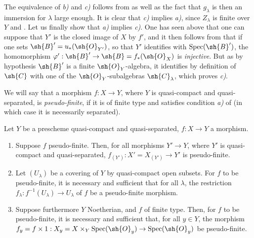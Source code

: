 The equivalence of \emph{b)} and \emph{c)} follows from  as well as the fact that $g_\lambda$ is then an immersion for $\lambda$ large enough.
It is clear that \emph{c)} implies \emph{a)}, since $Z_\lambda$ is finite over $Y$  and .
Let us finally show that \emph{a)} implies \emph{c)}.
One has seen above that one can suppose that $Y'$ is the closed image of $X$ by $f'$, and it then follows from  that if one sets $\sh{B}'=u_*(\sh{O}_{Y'})$, so that $Y'$ identifies with $\operatorname{Spec}(\sh{B}')$, the homomorphism $\varphi':\sh{B}'\to\sh{B}=f_*(\sh{O}_X)$ is \emph{injective}.
But as by hypothesis $\sh{B}'$ is a finite $\sh{O}_Y$-algebra, it identifies by definition of $\sh{C}$ with one of the $\sh{O}_Y$-subalgebras $\sh{C}_\lambda$, which proves \emph{c)}.

We will say that a morphism $f:X\to Y$, where $Y$ is quasi-compact and quasi-separated, is \emph{pseudo-finite}, if it is of finite type and satisfies condition \emph{a)} of  (in which case it is necessarily separated).

\begin{corollary}[8.12.4]
\label{IV.8.12.4}
Let $Y$ be a prescheme quasi-compact and quasi-separated, $f:X\to Y$ a morphism.
\begin{enumerate}[label=(\roman*)]
  \item Suppose $f$ pseudo-finite.
Then, for all morphisms $Y'\to Y$, where $Y'$ is quasi-compact and quasi-separated, $f_{(Y')}:X'=X_{(Y')}\to Y'$ is pseudo-finite.
  \item Let $(U_\lambda)$ be a covering of $Y$ by quasi-compact open subsets.
For $f$ to be pseudo-finite, it is necessary and sufficient that for all $\lambda$, the restriction $f_\lambda:f^{-1}(U_\lambda)\to U_\lambda$ of $f$ be a pseudo-finite morphism.
  \item Suppose furthermore $Y$ Noetherian, and $f$ of finite type.
Then, for $f$ to be pseudo-finite, it is necessary and sufficient that, for all $y\in Y$, the morphism $f_y=f\times 1:X_y=X\times_Y\operatorname{Spec}(\sh{O}_y)\to\operatorname{Spec}(\sh{O}_y)$ be pseudo-finite.
\end{enumerate}
\end{corollary}

